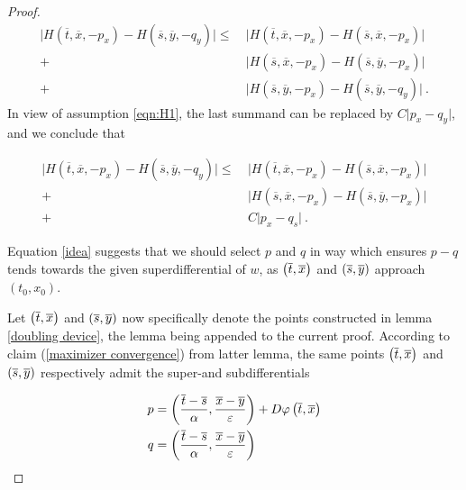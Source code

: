 \begin{theorem}
\begin{proof}
		  		\begin{equation*}
		  		\begin{split}
		  		\lvert H(\overline{t}, \overline{x}, -p_x) - H(\overline{s}, \overline{y}, -q_y) \rvert \leq \
		  		&\lvert H(\overline{t}, \overline{x}, -p_x) - H(\overline{s}, \overline{x}, -p_x) \rvert \\
		  		+&\lvert H(\overline{s}, \overline{x}, -p_x) - H(\overline{s}, \overline{y}, -p_x) \rvert \\
		  		+&\lvert H(\overline{s}, \overline{y}, -p_x) - H(\overline{s}, \overline{y}, -q_y) \rvert \ .
		  		\end{split} 
		  		\end{equation*}
		  		In view of assumption \eqref{eqn:H1}, the last summand can be replaced by $ C \lvert p_x - q_y \rvert $, and we conclude that
		  		
		  		\begin{equation}
		  		\label{idea}
		  		\begin{split}
		  		\lvert H(\overline{t}, \overline{x}, -p_x) - H(\overline{s}, \overline{y}, -q_y) \rvert \leq \
		  		&\lvert H(\overline{t}, \overline{x}, -p_x) - H(\overline{s}, \overline{x}, -p_x) \rvert \\
		  		+&\lvert H(\overline{s}, \overline{x}, -p_x) - H(\overline{s}, \overline{y}, -p_x) \rvert \\
		  		+& C \lvert p_x - q_s \rvert \ .
		  		\end{split}
		  		\end{equation}
		  		
		  		Equation \eqref{idea} suggests that we should select $ p $ and $ q $ in way which ensures $ p - q $ tends towards the given superdifferential of $ w $, as $ \left(\overline{t}, \overline{x}\right) $ and $ \left(\overline{s}, \overline{y}\right) $ approach $ (t_0, x_0) $.
		  		
		  		Let $ \left(\overline{t}, \overline{x}\right) $ and $ \left(\overline{s}, \overline{y}\right) $ now specifically denote the points constructed in lemma \ref{doubling device}, the lemma being appended to the current proof. According to claim (\ref{maximizer convergence}) from latter lemma, the same points $ \left(\overline{t}, \overline{x}\right) $ and $ \left(\overline{s}, \overline{y}\right) $ respectively admit the super-and subdifferentials
		  		
		  		\begin{align*}
		  				p &= \left( \frac{\overline{t} - \overline{s}}{\alpha}, \frac{\overline{x} - \overline{y}}{\varepsilon} \right) + D\varphi\left(\overline{t}, \overline{x}\right) \\
		  			q &= \left( \frac{\overline{t} - \overline{s}}{\alpha}, \frac{\overline{x} - \overline{y}}{\varepsilon} \right)
		  		\end{align*}
		  		

\end{proof}
\end{theorem}
